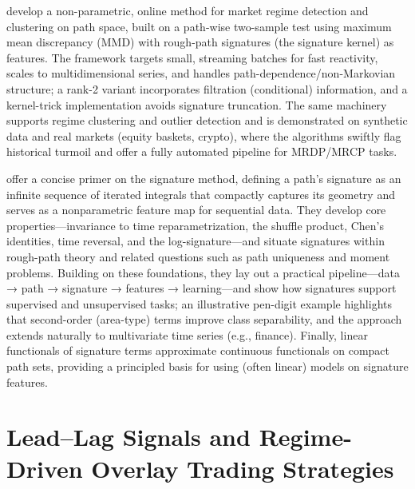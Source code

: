 \cite{issa2023nonparametriconlinemarketregime} develop a non-parametric, online method for market regime detection and clustering on path space, built on a path-wise two-sample test using maximum mean discrepancy (MMD) with rough-path signatures (the signature kernel) as features. 
 The framework targets small, streaming batches for fast reactivity, scales to multidimensional series, and handles path-dependence/non-Markovian structure; a rank-2 variant incorporates filtration (conditional) information, and a kernel-trick implementation avoids signature truncation. The same machinery supports regime clustering and outlier detection and is demonstrated on synthetic data and real markets (equity baskets, crypto), where the algorithms swiftly flag historical turmoil and offer a fully automated pipeline for MRDP/MRCP tasks.

\cite{chevyrev2025primersignaturemethodmachine} offer a concise primer on the signature method, defining a path’s signature as an infinite sequence of iterated integrals that compactly captures its geometry and serves as a nonparametric feature map for sequential data. They develop core properties—invariance to time reparametrization, the shuffle product, Chen’s identities, time reversal, and the log-signature—and situate signatures within rough-path theory and related questions such as path uniqueness and moment problems. Building on these foundations, they lay out a practical pipeline—data → path → signature → features → learning—and show how signatures support supervised and unsupervised tasks; an illustrative pen-digit example highlights that second-order (area-type) terms improve class separability, and the approach extends naturally to multivariate time series (e.g., finance). Finally, linear functionals of signature terms approximate continuous functionals on compact path sets, providing a principled basis for using (often linear) models on signature features.

\section{Lead–Lag Signals and Regime-Driven Overlay Trading Strategies}

